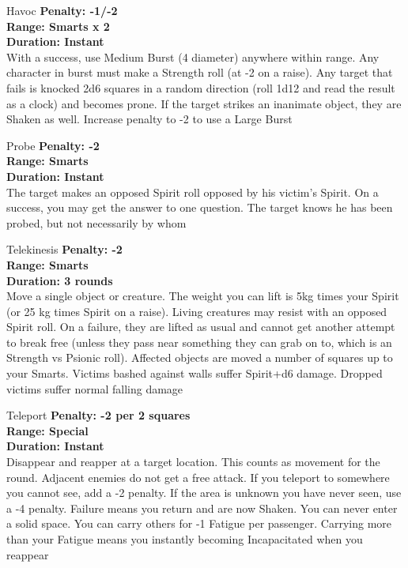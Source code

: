 \begin{multicols}{2}
\begin{genericsection}{Havoc}
\textbf{Penalty: -1/-2}\\
\textbf{Range: Smarts x 2}\\
\textbf{Duration: Instant}\\
With a success, use Medium Burst (4 diameter) anywhere within range. Any character in burst must make a Strength roll (at -2 on a raise). Any target that fails is knocked 2d6 squares in a random direction (roll 1d12 and read the result as a clock) and becomes prone. If the target strikes an inanimate object, they are Shaken as well. Increase penalty to -2 to use a Large Burst\\
\end{genericsection}

\begin{genericsection}{Probe}
\textbf{Penalty: -2}\\
\textbf{Range: Smarts}\\
\textbf{Duration: Instant}\\
The target makes an opposed Spirit roll opposed by his victim’s Spirit. On a success, you may get the answer to one question. The target knows he has been probed, but not necessarily by whom\\
\end{genericsection}

\begin{genericsection}{Telekinesis}
\textbf{Penalty: -2}\\
\textbf{Range: Smarts}\\
\textbf{Duration: 3 rounds}\\
Move a single object or creature. The weight you can lift is 5kg times your Spirit (or 25 kg times Spirit on a raise). Living creatures may resist with an opposed Spirit roll. On a failure, they are lifted as usual and cannot get another attempt to break free (unless they pass near something they can grab on to, which is an Strength vs Psionic roll). Affected objects are moved a number of squares up to your Smarts. Victims bashed against walls suffer Spirit+d6 damage. Dropped victims suffer normal falling damage\\
\end{genericsection}

\begin{genericsection}{Teleport}
\textbf{Penalty: -2 per 2 squares}\\
\textbf{Range: Special}\\
\textbf{Duration: Instant}\\
Disappear and reapper at a target location. This counts as movement for the round. Adjacent enemies do not get a free attack. If you teleport to somewhere you cannot see, add a -2 penalty. If the area is unknown you have never seen, use a -4 penalty. Failure means you return and are now Shaken. You can never enter a solid space. You can carry others for -1 Fatigue per passenger. Carrying more than your Fatigue means you instantly becoming Incapacitated when you reappear\\
\end{genericsection}


\end{multicols}
